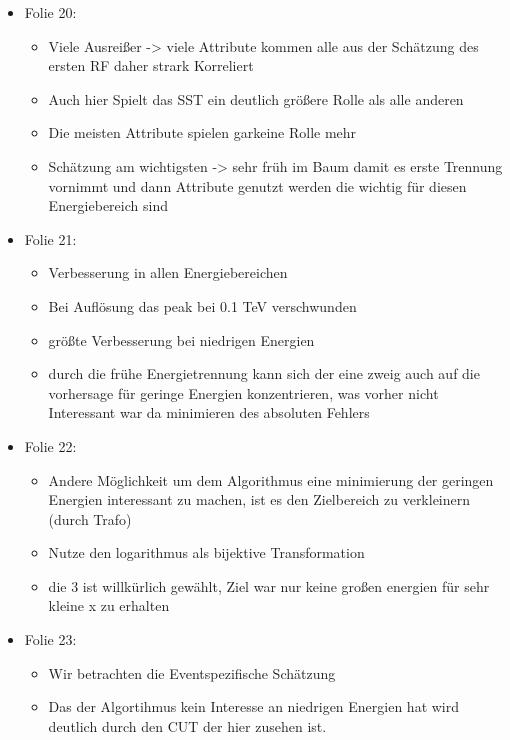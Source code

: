 \documentclass[
  bibliography=totoc,     %
  captions=tableheading,  %
  titlepage=firstiscover, %
]{scrartcl}
\begin{document}
\begin{itemize}
\begin{itemize}
      \end{itemize}
    \item Folie 20:
      \begin{itemize}
        \item Viele Ausreißer -> viele Attribute kommen alle aus der Schätzung des ersten RF daher strark Korreliert
        \item Auch hier Spielt das SST ein deutlich größere Rolle als alle anderen
        \item Die meisten Attribute spielen garkeine Rolle mehr
        \item Schätzung am wichtigsten -> sehr früh im Baum damit es erste Trennung vornimmt und dann Attribute genutzt werden die wichtig für diesen
              Energiebereich sind
      \end{itemize}
    \item Folie 21:
      \begin{itemize}
        \item Verbesserung in allen Energiebereichen
        \item Bei Auflösung das peak bei 0.1 TeV verschwunden
        \item größte Verbesserung bei niedrigen Energien
        \item durch die frühe Energietrennung kann sich der eine zweig auch auf die vorhersage für geringe Energien konzentrieren, was vorher
              nicht Interessant war da minimieren des absoluten Fehlers
      \end{itemize}
    \item Folie 22:
      \begin{itemize}
        \item Andere Möglichkeit um dem Algorithmus eine minimierung der geringen Energien interessant zu machen, ist es den Zielbereich zu
              verkleinern (durch Trafo)
        \item Nutze den logarithmus als bijektive Transformation
        \item die $3$ ist willkürlich gewählt, Ziel war nur keine großen energien für sehr kleine x zu erhalten
      \end{itemize}
    \item Folie 23:
      \begin{itemize}
        \item Wir betrachten die Eventspezifische Schätzung
        \item Das der Algortihmus kein Interesse an niedrigen Energien hat wird deutlich durch den CUT der hier zusehen ist.

\end{itemize}
\end{itemize}
\end{document}
